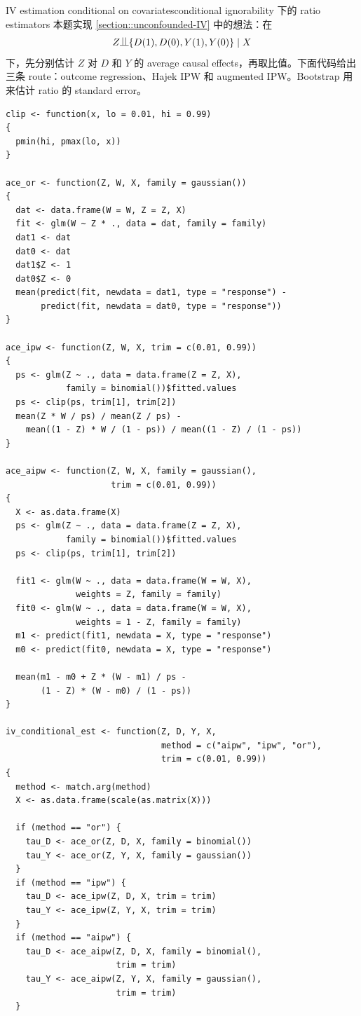 \begin{exercisesolution}{IV estimation conditional on covariates}{conditional ignorability 下的 ratio estimators}
本题实现 \cref{section::unconfounded-IV} 中的想法：在
\[
Z\ind \{D(1),D(0),Y(1),Y(0)\}\mid X
\]
下，先分别估计 $Z$ 对 $D$ 和 $Y$ 的 average causal effects，再取比值。下面代码给出三条 route：outcome regression、Hajek IPW 和 augmented IPW。Bootstrap 用来估计 ratio 的 standard error。

\begin{lstlisting}
clip <- function(x, lo = 0.01, hi = 0.99)
{
  pmin(hi, pmax(lo, x))
}

ace_or <- function(Z, W, X, family = gaussian())
{
  dat <- data.frame(W = W, Z = Z, X)
  fit <- glm(W ~ Z * ., data = dat, family = family)
  dat1 <- dat
  dat0 <- dat
  dat1$Z <- 1
  dat0$Z <- 0
  mean(predict(fit, newdata = dat1, type = "response") -
       predict(fit, newdata = dat0, type = "response"))
}

ace_ipw <- function(Z, W, X, trim = c(0.01, 0.99))
{
  ps <- glm(Z ~ ., data = data.frame(Z = Z, X),
            family = binomial())$fitted.values
  ps <- clip(ps, trim[1], trim[2])
  mean(Z * W / ps) / mean(Z / ps) -
    mean((1 - Z) * W / (1 - ps)) / mean((1 - Z) / (1 - ps))
}

ace_aipw <- function(Z, W, X, family = gaussian(),
                     trim = c(0.01, 0.99))
{
  X <- as.data.frame(X)
  ps <- glm(Z ~ ., data = data.frame(Z = Z, X),
            family = binomial())$fitted.values
  ps <- clip(ps, trim[1], trim[2])

  fit1 <- glm(W ~ ., data = data.frame(W = W, X),
              weights = Z, family = family)
  fit0 <- glm(W ~ ., data = data.frame(W = W, X),
              weights = 1 - Z, family = family)
  m1 <- predict(fit1, newdata = X, type = "response")
  m0 <- predict(fit0, newdata = X, type = "response")

  mean(m1 - m0 + Z * (W - m1) / ps -
       (1 - Z) * (W - m0) / (1 - ps))
}

iv_conditional_est <- function(Z, D, Y, X,
                               method = c("aipw", "ipw", "or"),
                               trim = c(0.01, 0.99))
{
  method <- match.arg(method)
  X <- as.data.frame(scale(as.matrix(X)))

  if (method == "or") {
    tau_D <- ace_or(Z, D, X, family = binomial())
    tau_Y <- ace_or(Z, Y, X, family = gaussian())
  }
  if (method == "ipw") {
    tau_D <- ace_ipw(Z, D, X, trim = trim)
    tau_Y <- ace_ipw(Z, Y, X, trim = trim)
  }
  if (method == "aipw") {
    tau_D <- ace_aipw(Z, D, X, family = binomial(),
                      trim = trim)
    tau_Y <- ace_aipw(Z, Y, X, family = gaussian(),
                      trim = trim)
  }


\end{lstlisting}
\end{exercisesolution}

